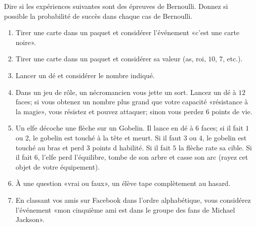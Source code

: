
\begin{exercice}\label{exoPremiere-0071}

    Dire si les expériences suivantes sont des épreuves de Bernoulli. Donnez si possible la probabilité de succès dans chaque cas de Bernoulli.
    \begin{multicols}{2}
        \begin{enumerate}
            \item
                Tirer une carte dans un paquet et considérer l'événement «c'est une carte noire». 
            \item
                Tirer une carte dans un paquet et considérer sa valeur (as, roi, \( 10\), \( 7\), etc.).
            \item
                Lancer un dé et considérer le nombre indiqué.
            \item
                Dans un jeu de rôle, un nécromancien vous jette un sort. Lancez un dé à \( 12\) faces; si vous obtenez un nombre plus grand que votre capacité «résistance à la magie», vous résistez et pouvez attaquer; sinon vous perdez \( 6\) points de vie.
            \item
                Un elfe décoche une flèche sur un Gobelin. Il lance en dé à \( 6\) faces; si il fait \( 1\) ou \( 2\), le gobelin est touché à la tête et meurt. Si il faut \( 3\) ou \( 4\), le gobelin est touché au bras et perd \( 3\) points d habilité. Si il fait \( 5\) la flèche rate sa cible. Si il fait \( 6\), l'elfe perd l'équilibre, tombe de son arbre et casse son arc (rayez cet objet de votre équipement).
            \item
                À une question «vrai ou faux», un élève tape complètement au hasard.
            \item
                En classant vos amis sur Facebook dans l'ordre alphabétique, vous considérez l'événement «mon cinquième ami est dans le groupe des fans de Michael Jackson».
        \end{enumerate}
    \end{multicols}

\end{exercice}
